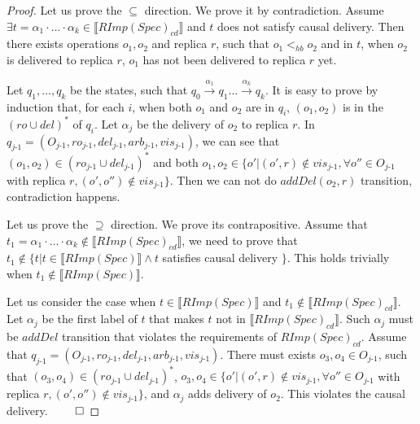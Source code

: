 \begin {proof}

Let us prove the $\subseteq$ direction. We prove it by contradiction. Assume $\exists t =\alpha_1 \cdot \ldots \cdot \alpha_k \in \llbracket RImp(Spec)_{\textit{cd}} \rrbracket$ and $t$ does not satisfy causal delivery. Then there exists operations $o_1,o_2$ and replica $r$, such that $o_1 <_{hb} o_2$ and in $t$, when $o_2$ is delivered to replica $r$, $o_1$ has not been delivered to replica $r$ yet.

Let $q_1,\ldots,q_k$ be the states, such that $q_0 {\xrightarrow{\alpha_1}} q_1 \ldots {\xrightarrow{\alpha_k}} q_k$. It is easy to prove by induction that, for each $i$, when both $o_1$ and $o_2$ are in $q_i$, $(o_1,o_2)$ is in the $(ro \cup del)^*$ of $q_i$. Let $\alpha_j$ be the delivery of $o_2$ to replica $r$. In $q_{\textit{j-1}} = (O_{\textit{j-1}},ro_{\textit{j-1}},del_{\textit{j-1}},arb_{\textit{j-1}},vis_{\textit{j-1}})$, we can see that $(o_1,o_2) \in (ro_{\textit{j-1}} \cup del_{\textit{j-1}})^*$ and both $o_1,o_2 \in \{ o' \vert (o',r) \notin vis_{\textit{j-1}}, \forall o'' \in O_{\textit{j-1}}$  with replica $r, (o',o'') \notin vis_{\textit{j-1}} \}$. Then we can not do $addDel(o_2,r)$ transition, contradiction happens.

Let us prove the $\supseteq$ direction. We prove its contrapositive. Assume that $t_1 =\alpha_1 \cdot \ldots \cdot \alpha_k \notin \llbracket RImp(Spec)_{\textit{cd}} \rrbracket$, we need to prove that $t_1 \notin \{ t \vert t \in \llbracket RImp(Spec) \rrbracket \wedge t$ satisfies causal delivery $\}$. This holds trivially when $t_1 \notin \llbracket RImp(Spec) \rrbracket$.

Let us consider the case when $t \in \llbracket RImp(Spec) \rrbracket$ and $t_1 \notin \llbracket RImp(Spec)_{\textit{cd}} \rrbracket$. Let $\alpha_j$ be the first label of $t$ that makes $t$ not in $\llbracket RImp(Spec)_{\textit{cd}} \rrbracket$. Such $\alpha_j$ must be $addDel$ transition that violates the requirements of $RImp(Spec)_{\textit{cd}}$. Assume that $q_{\textit{j-1}} = (O_{\textit{j-1}},ro_{\textit{j-1}},del_{\textit{j-1}},arb_{\textit{j-1}},vis_{\textit{j-1}})$. There must exists $o_3,o_4 \in O_{\textit{j-1}}$, such that $(o_3,o_4) \in (ro_{\textit{j-1}} \cup del_{\textit{j-1}})^*$, $o_3,o_4 \in \{ o' \vert (o',r) \notin vis_{\textit{j-1}}, \forall o'' \in O_{\textit{j-1}}$  with replica $r, (o',o'') \notin vis_{\textit{j-1}} \}$, and $\alpha_j$ adds delivery of $o_2$. This violates the causal delivery. $\qed$
\end {proof}



